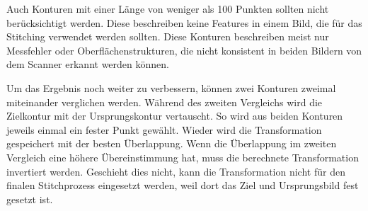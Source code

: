 \documentclass[../main.tex]{subfiles}
\begin{document}
Auch Konturen mit einer Länge von weniger als 100 Punkten sollten nicht berücksichtigt 
werden. Diese beschreiben keine Features in einem Bild, die für das Stitching verwendet 
werden sollten. Diese Konturen beschreiben meist nur Messfehler oder 
Oberflächenstrukturen, die nicht konsistent in beiden Bildern von dem Scanner erkannt 
werden können.

Um das Ergebnis noch weiter zu verbessern, können zwei Konturen zweimal miteinander 
verglichen werden. Während des zweiten Vergleichs wird die Zielkontur mit der 
Ursprungskontur vertauscht. So wird aus beiden Konturen jeweils einmal ein fester 
Punkt gewählt. Wieder wird die Transformation gespeichert mit der besten Überlappung.
Wenn die Überlappung im zweiten Vergleich eine höhere Übereinstimmung hat, muss die 
berechnete Transformation invertiert werden. Geschieht dies nicht, kann die 
Transformation nicht für den finalen Stitchprozess eingesetzt werden, weil dort 
das Ziel und Ursprungsbild fest gesetzt ist.
\end{document}
